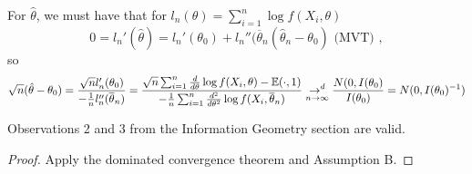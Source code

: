 \documentclass[a4paper]{article}
\begin{document}
\begin{idea}[p=1]
	For $\hat{\theta}$, we must have that for $l_n(\theta) = \sum_{i=1}^{n} \log f(X_i, \theta)$
	\[
		0 = l_{n}' (\hat{\theta}) = l_{n}' (\theta_0) + l _{n}''(\overline{\theta}_n (\hat{\theta}_n - \theta_0) \text{ (MVT) }
	,\]
	so
	\[
		\sqrt{n} (\hat{\theta} - \theta_0) = \frac{\sqrt{n} l_{n}' (\theta_0)}{- \frac{1}{n} l_{n}''(\overline{\theta}_n)} = \frac{\sqrt{n} \sum_{i=1}^{n} \frac{d}{d\theta} \log f(X_i, \theta) - \mathbb{E}(\cdot , 1) }{- \frac{1}{n} \sum_{i=1}^{n} \frac{d^2}{d\theta ^2} \log f(X_i, \overline{\theta}_n)} \underset{n\to \infty}{\to^{d}}  \frac{N(0, I(\theta_0)}{I(\theta_0)} = N(0, I(\theta_0)^{-1})
	\] 
\end{idea}
		
\begin{lemma}
	Observations 2 and 3 from the Information Geometry section are valid.		
\end{lemma}
	
\begin{proof}
	Apply the dominated convergence theorem and Assumption B.
\end{proof}
\end{document}
